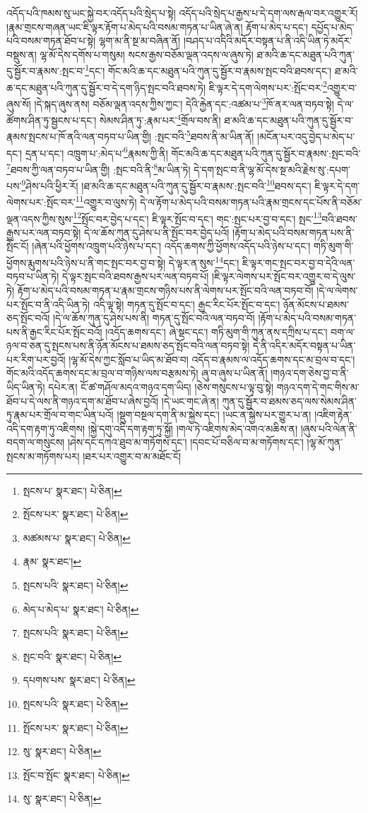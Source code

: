 འདོད་པའི་ཁམས་སུ་ཡང་སྐྱེ་བར་འདོད་པའི་སྲེད་པ་སྟེ། འདོད་པའི་སྲེད་པ་རྒྱས་པ་དེ་དག་ལས་རྒལ་བར་འགྱུར་རོ། །རྣམ་གྲངས་གཞན་ཡང་ཇི་ལྟར་རྟོག་པ་མེད་པའི་བསམ་གཏན་པ་ཡིན་ཞེ་ན། རྟོག་པ་མེད་པ་དང་། དཔྱོད་པ་མེད་པའི་བསམ་གཏན་ཐོབ་པ་སྟེ། ལྷག་མ་ནི་སྔ་མ་བཞིན་ནོ། །བཤད་པ་འདིའི་མདོར་བསྟན་པ་ནི་འདི་ཡིན་ཏེ་མདོར་བསྡུས་ན། ལྷ་མོ་དེས་དགོས་པ་གསུམ། སངས་རྒྱས་བཅོམ་ལྡན་འདས་ལ་ཞུས་ཏེ། ཐ་མའི་ཆ་དང་མཐུན་པའི་ཀུན་དུ་སྦྱོར་བ་རྣམས་:སྤང་བ་\footnote{སྤངས་པ་  སྣར་ཐང་།  པེ་ཅིན། }དང་། གོང་མའི་ཆ་དང་མཐུན་པའི་ཀུན་དུ་སྦྱོར་བ་རྣམས་སྤང་བའི་ཐབས་དང་། ཐ་མའི་ཆ་དང་མཐུན་པའི་ཀུན་དུ་སྦྱོར་བ་དེ་དག་ཉིད་སྤང་བའི་ཐབས་ཏེ། ཇི་ལྟར་དེ་དག་ལེགས་པར་:སྤོང་བར་\footnote{སྤོངས་པར་  སྣར་ཐང་།  པེ་ཅིན། }འགྱུར་བ་ཞུས་སོ། །དེ་སྐད་ཞུས་ནས། བཅོམ་ལྡན་འདས་ཀྱིས་ཀྱང་། དེའི་རྐྱེན་དང་:འཚམ་པ་\footnote{མཚམས་པ་  སྣར་ཐང་།  པེ་ཅིན། }ཁོ་ནར་ལན་བཏབ་སྟེ། དེ་ལ་ཚོགས་ཤིན་ཏུ་སྦྱངས་པ་དང་། སེམས་ཤིན་ཏུ་:རྣམ་པར་\footnote{རྣམ་  སྣར་ཐང་། }གྲོལ་བས་ནི། ཐ་མའི་ཆ་དང་མཐུན་པའི་ཀུན་དུ་སྦྱོར་བ་རྣམས་སྤངས་པ་ཁོ་ནའི་ལན་བཏབ་པ་ཡིན་གྱི། :སྤང་བའི་\footnote{སྤངས་པའི་  སྣར་ཐང་།  པེ་ཅིན། }ཐབས་ནི་མ་ཡིན་ནོ། །མངོན་པར་འདུ་བྱེད་པ་མེད་པ་དང་། དྲན་པ་དང་། འཁྲུག་པ་:མེད་པ་\footnote{མེད་པ་མེད་པ་  སྣར་ཐང་།  པེ་ཅིན། }རྣམས་ཀྱི་ནི། གོང་མའི་ཆ་དང་མཐུན་པའི་ཀུན་དུ་སྦྱོར་བ་རྣམས་:སྤང་བའི་\footnote{སྤངས་པའི་  སྣར་ཐང་།  པེ་ཅིན། }ཐབས་ཀྱི་ལན་བཏབ་པ་ཡིན་གྱི། :སྤང་བའི་ནི་\footnote{སྤང་བའི་  སྣར་ཐང་།  པེ་ཅིན། }མ་ཡིན་ཏེ། དེ་དག་སྤང་བ་ནི་ལྷ་མོ་དེས་སྔ་མའི་རྗེས་སུ་:དཔག་པས་\footnote{དཔགས་པས་  སྣར་ཐང་།  པེ་ཅིན། }ཤེས་པའི་ཕྱིར་རོ། །ཐ་མའི་ཆ་དང་མཐུན་པའི་ཀུན་དུ་སྦྱོར་བ་རྣམས་:སྤང་བའི་\footnote{སྤངས་པའི་  སྣར་ཐང་།  པེ་ཅིན། }ཐབས་དང་། ཇི་ལྟར་དེ་དག་ལེགས་པར་:སྤོང་བར་\footnote{སྤོངས་པར་  སྣར་ཐང་།  པེ་ཅིན། }འགྱུར་བ་ལུས་ཏེ། དེ་ལ་རྟོག་པ་མེད་པའི་བསམ་གཏན་པའི་རྣམ་གྲངས་དང་པོས་ནི་བཅོམ་ལྡན་འདས་ཀྱིས་སུས་\footnote{སུ་  སྣར་ཐང་།  པེ་ཅིན། }སྤོང་བར་བྱེད་པ་དང་། ཇི་ལྟར་སྤོང་བ་དང་། གང་:སྤང་པར་བྱ་བ་དང་། སྤང་\footnote{སྤོང་བ་སྤོང་  སྣར་ཐང་།  པེ་ཅིན། }བའི་ཐབས་རྒྱས་པར་ལན་བཏབ་སྟེ། དེ་ལ་ཆོས་ཀུན་དུ་ཤེས་པ་ནི་སྤོང་བར་བྱེད་པའོ། །རྟོག་པ་མེད་པའི་བསམ་གཏན་པས་ནི་སྤོང་ངོ། །ཞེན་པའི་ཕྱོགས་འཁྲུག་པའི་ཉེས་པ་དང་། འདོད་ཆགས་ཀྱི་ཕྱོགས་འདོད་པའི་ཉེས་པ་དང་། གཏི་མུག་གི་ཕྱོགས་རྨུགས་པའི་ཉེས་པ་ནི་གང་སྤང་བར་བྱ་བ་སྟེ། དེ་ལྟར་ན་སུས་\footnote{སུ་  སྣར་ཐང་།  པེ་ཅིན། }དང་། ཇི་ལྟར་གང་སྤང་བར་བྱ་བ་དེའི་ལན་བཏབ་པ་ཡིན་ཏེ། དེ་ལྟར་སྤང་བའི་ཐབས་རྒྱས་པར་ལན་བཏབ་པོ། །ཇི་ལྟར་ལེགས་པར་སྤོང་བར་འགྱུར་བ་དེ་ལུས་ཏེ། རྟོག་པ་མེད་པའི་བསམ་གཏན་པ་རྣམ་གྲངས་གཉིས་པས་ནི་ལེགས་པར་སྤོང་བའི་ལན་བཏབ་བོ། །དེ་ལ་ལེགས་པར་སྤོང་བ་ནི་འདི་ཡིན་ཏེ། འདི་ལྟ་སྟེ། གཏན་དུ་སྤོང་བ་དང་། རྒྱང་རིང་པོར་སྤོང་བ་དང་། ཉོན་མོངས་པ་ཐམས་ཅད་སྤོང་བའོ། །དེ་ལ་ཆོས་ཀུན་དུ་ཤེས་པས་ནི། གཏན་དུ་སྤོང་བའི་ལན་བཏབ་བོ། །རྟོག་པ་མེད་པའི་བསམ་གཏན་པས་ནི་རྒྱང་རིང་པོར་སྤོང་བའོ། །འདོད་ཆགས་དང་། ཞེ་སྡང་དང་། གཏི་མུག་གི་ཀུན་ནས་དཀྲིས་པ་དང་། བག་ལ་ཉལ་བ་ཅན་དུ་སྤངས་པས་ནི་ཉོན་མོངས་པ་ཐམས་ཅད་སྤོང་བའི་ལན་བཏབ་སྟེ། དེ་ནི་འདིར་མདོར་བསྟན་པ་ཡིན་པར་རིག་པར་བྱའོ། །ལྷ་མོ་དེས་ཀྱང་སློབ་པ་ཡིད་མ་ཐོབ་བ། འདོད་བ་རྣམས་ལ་འདོད་ཆགས་དང་མ་བྲལ་བ་དང་། གོང་མའི་འདོད་ཆགས་དང་མ་བྲལ་བ་གཉིས་ལས་བརྩམས་ཏེ། ཞུ་བ་ཞུས་པ་ཡིན་ནོ། །གཉའ་དག་ཅེས་བྱ་བ་ནི་ཡིད་ཡིན་ཏེ། དཔེར་ན། ངོ་ཚ་གཤོལ་མདའ་གཉའ་དག་ཡིད། །ཅེས་གསུངས་པ་ལྟ་བུ་སྟེ། གཉའ་དག་དེ་གང་གིས་མ་ཐོབ་པ་དེ་ལས་ནི་གཉའ་དག་མ་ཐོབ་པ་ཞེས་བྱའོ། །དེ་ཡང་གང་ཞེ་ན། ཀུན་དུ་སྦྱོར་བ་ཐམས་ཅད་ལས་སེམས་ཤིན་ཏུ་རྣམ་པར་གྲོལ་བ་གང་ཡིན་པའོ། །སྡུག་བསྔལ་དག་ནི་མ་སྐྱེས་དང་། །ཡང་ན་སྐྱེས་པར་གྱུར་པ་ན། །འཇིག་རྟེན་འདི་དག་རྟག་ཏུ་འཇིགས། །སྐྱེ་དགུ་འདི་དག་རྟག་ཏུ་སྐྱོ། །གལ་ཏེ་འཇིགས་མེད་འགའ་མཆིས་ན། །ཞུས་པའི་ལེན་ནི་བདག་ལ་གསུངས། །ཤེས་དང་དཀའ་ཐུབ་མ་གཏོགས་དང་། །དབང་པོ་བཅིལ་བ་མ་གཏོགས་དང་། །ལྷ་མོ་ཀུན་སྤངས་མ་གཏོགས་པར། །ཐར་པར་འགྱུར་བ་མ་མཐོང་ངོ། 
